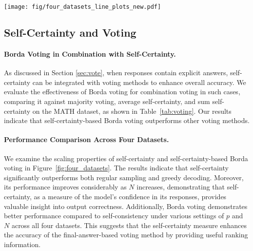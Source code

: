 \begin{figure*}[t]
    \centering
    \texttt{[image: fig/four\_datasets\_line\_plots\_new.pdf]}
    \caption{Performance evaluation across four datasets employing different strategies with Llama-3.1-8B-Instruct. These line graphs demonstrates the strong scaling ability of both self-certainty and Borda voting.}
    \label{fig:four_datasets}
\end{figure*}

\subsection{Self-Certainty and Voting}\label{sec:exp_voting}
\paragraph{Borda Voting in Combination with Self-Certainty.}
As discussed in Section \ref{sec:vote}, when responses contain explicit answers, self-certainty can be integrated with voting methods to enhance overall accuracy. We evaluate the effectiveness of Borda voting for combination voting in such cases, comparing it against majority voting, average self-certainty, and sum self-certainty on the MATH dataset, as shown in Table~\ref{tab:voting}. Our results indicate that self-certainty-based Borda voting outperforms other voting methods.



\paragraph{Performance Comparison Across Four Datasets.}
We examine the scaling properties of self-certainty and self-certainty-based Borda voting in Figure~\ref{fig:four_datasets}. The results indicate that self-certainty significantly outperforms both regular sampling and greedy decoding. Moreover, its performance improves considerably as $N$ increases, demonstrating that self-certainty, as a measure of the model’s confidence in its responses, provides valuable insight into output correctness.
Additionally, Borda voting demonstrates better performance compared to self-consistency under various settings of \(p\) and \(N\) across all four datasets. This suggests that the self-certainty measure enhances the accuracy of the final-answer-based voting method by providing useful ranking information. 



